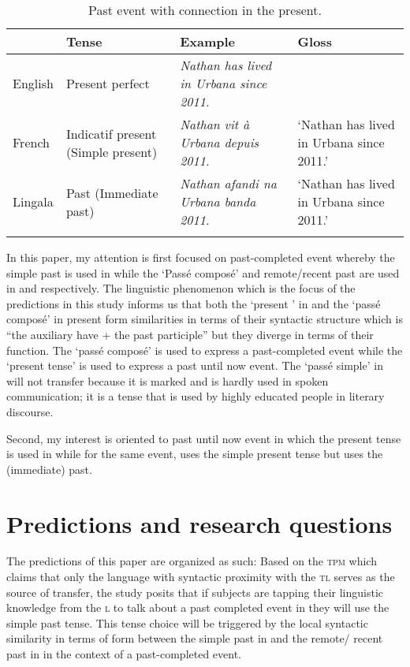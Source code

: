 \documentclass[output=paper,
modfonts
]{langscibook}
\begin{document}
\begin{table}
\caption{Past event with connection in the present.}
\begin{tabularx}{\textwidth}{lQQQ}
\lsptoprule
 & {\bfseries Tense} & {\bfseries Example} & {\bfseries Gloss}\\
\midrule
{ English} & { Present perfect} & { \textit{Nathan has lived in Urbana since 2011.}} & \\
\tablevspace
{ French} & { Indicatif present (Simple present)} & { \textit{Nathan vit à Urbana depuis 2011.}} & { ‘Nathan has lived in Urbana since 2011.’}\\
\tablevspace
{ Lingala} & { Past (Immediate past)} & { \textit{Nathan afandi na Urbana banda 2011.}} & { ‘Nathan has lived in Urbana since 2011.’}\\
\lspbottomrule
\end{tabularx}
\label{tab:kabasele:2}
\end{table}

In this paper, my attention is first focused on past-completed event whereby the simple past is used in  while the ‘Passé composé’ and remote/recent past are used in  and  respectively. The linguistic phenomenon which is the focus of the predictions in this study informs us that both the ‘present ’ in  and the ‘passé composé’ in  present form similarities in terms of their syntactic structure which is “the auxiliary have + the past participle” but they diverge in terms of their function. The ‘passé composé’ is used to express a past-completed event while the ‘present  tense’ is used to express a past until now event. The ‘passé simple’ in  will not transfer because it is marked and is hardly used in spoken communication; it is a tense that is used by highly educated people in literary discourse.

Second, my interest is oriented to past until now event in which the present  tense is used in  while for the same event,  uses the simple present tense but  uses the (immediate) past.

\section{Predictions and research questions}\label{sec:kabasele:4}

The predictions of this paper are organized as such: Based on the \textsc{tpm} which claims that only the language with syntactic proximity with the \textsc{tl} serves as the source of transfer, the study posits that if subjects are tapping their linguistic knowledge from the \textsc{l} to talk about a past completed event in  they will use the simple past tense. This tense choice will be triggered by the local syntactic similarity in terms of form between the simple past in  and the remote/ recent past in  in the context of a past-completed event. 
\end{document}
